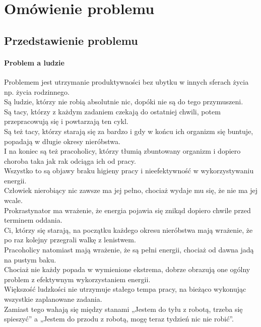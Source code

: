 \documentclass[a4paper,11pt]{report}
\begin{document}
\chapter {Omówienie problemu}
\section {Przedstawienie problemu}
\subsubsection{Problem a ludzie}
Problemem jest utrzymanie produktywności bez ubytku w innych sferach życia np. życia rodzinnego.
\\Są ludzie, którzy nie robią absolutnie nic, dopóki nie są do tego przymuszeni.
\\Są tacy, którzy z każdym zadaniem czekają do ostatniej chwili, potem przepracowują się i powtarzają ten cykl.
\\Są też tacy, którzy starają się za bardzo i gdy w końcu ich organizm się buntuje, popadają w długie okresy nieróbstwa.
\\I na koniec są też pracoholicy, którzy tłumią zbuntowany organizm i dopiero choroba taka jak rak odciąga ich od pracy.
\\Wszystko to są objawy braku higieny pracy i nieefektywność w wykorzystywaniu energii.
\vspace{1cm}
\\Człowiek nierobiący nic zawsze ma jej pełno, chociaż wydaje mu się, że nie ma jej wcale.
\\Prokrastynator ma wrażenie, że energia pojawia się znikąd dopiero chwile przed terminem oddania.
\\Ci, którzy się starają, na początku każdego okresu nieróbstwa mają wrażenie, że po raz kolejny przegrali walkę z lenistwem.
\\Pracoholicy natomiast mają wrażenie, że są pełni energii, chociaż od dawna jadą na pustym baku.
\\Chociaż nie każdy popada w wymienione ekstrema, dobrze obrazują one ogólny problem z efektywnym wykorzystaniem energii.
\vspace{1cm}
\\Większość ludzkości nie utrzymuje stałego tempa pracy, na bieżąco wykonując wszystkie zaplanowane zadania.
\\Zamiast tego wahają się między stanami „Jestem do tyłu z robotą, trzeba się spieszyć” a „Jestem do przodu z robotą, mogę teraz tydzień nic nie robić”.
\end{document}
